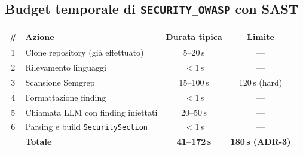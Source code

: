 \documentclass[11pt,a4paper]{article}
\begin{document}
\subsection{Budget temporale di \texttt{SECURITY\_OWASP} con SAST}
\label{ssec:be-as-budget}

\begin{center}
\begin{tabular}{clcc}
\toprule
\# & Azione & Durata tipica & Limite \\
\midrule
1 & Clone repository (già effettuato) & 5--20\,s & --- \\
2 & Rilevamento linguaggi & $<1$\,s & --- \\
3 & Scansione Semgrep & 15--100\,s & 120\,s (hard) \\
4 & Formattazione finding & $<1$\,s & --- \\
5 & Chiamata LLM con finding iniettati & 20--50\,s & --- \\
6 & Parsing e build \texttt{SecuritySection} & $<1$\,s & --- \\
\midrule
 & \textbf{Totale} & \textbf{41--172\,s} & \textbf{180\,s (ADR-3)} \\
\bottomrule
\end{tabular}
\end{center}
\end{document}
